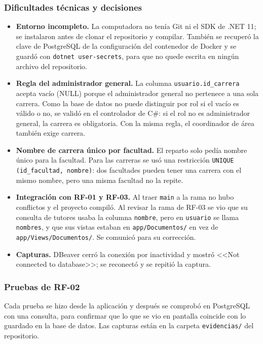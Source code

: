 \documentclass[12pt,a4paper,oneside]{article}
\begin{document}
\subsubsection{Dificultades técnicas y decisiones}
\begin{itemize}[leftmargin=1.8em,itemsep=3pt]
\item \textbf{Entorno incompleto.} La computadora no tenía Git ni el SDK de .NET 11; se instalaron antes de clonar el repositorio y compilar. También se recuperó la clave de PostgreSQL de la configuración del contenedor de Docker y se guardó con \texttt{dotnet user-secrets}, para que no quede escrita en ningún archivo del repositorio.
\item \textbf{Regla del administrador general.} La columna \texttt{usuario.id\_carrera} acepta vacío (NULL) porque el administrador general no pertenece a una sola carrera. Como la base de datos no puede distinguir por rol si el vacío es válido o no, se validó en el controlador de C\#: si el rol no es administrador general, la carrera es obligatoria. Con la misma regla, el coordinador de área también exige carrera.
\item \textbf{Nombre de carrera único por facultad.} El reparto solo pedía nombre único para la facultad. Para las carreras se usó una restricción \texttt{UNIQUE (id\_facultad, nombre)}: dos facultades pueden tener una carrera con el mismo nombre, pero una misma facultad no la repite.
\item \textbf{Integración con RF-01 y RF-03.} Al traer \texttt{main} a la rama no hubo conflictos y el proyecto compiló. Al revisar la rama de RF-03 se vio que su consulta de tutores usaba la columna \texttt{nombre}, pero en \texttt{usuario} se llama \texttt{nombres}, y que sus vistas estaban en \texttt{app/Documentos/} en vez de \texttt{app/Views/Documentos/}. Se comunicó para su corrección.
\item \textbf{Capturas.} DBeaver cerró la conexión por inactividad y mostró <<Not connected to database>>; se reconectó y se repitió la captura.
\end{itemize}

\subsubsection{Pruebas de RF-02}
Cada prueba se hizo desde la aplicación y después se comprobó en PostgreSQL con una consulta, para confirmar que lo que se vio en pantalla coincide con lo guardado en la base de datos. Las capturas están en la carpeta \texttt{evidencias/} del repositorio.
\end{document}
